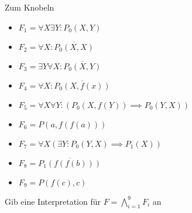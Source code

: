 {\begin{frame}{Zum Knobeln}
	\small
	\begin{block}{}
		\begin{multicols}{2}
			\begin{itemize}
				\item $F_1 = \forall X \exists Y: P_0(X,Y)$
				\item $F_2 = \forall X: \overline{P_0(X,X)}$
				\item $F_3 = \exists Y \forall X: \overline{P_0(X,Y)}$
				\item $F_4 = \forall X: \overline{P_0(X,f(x))}$
				\item {\scriptsize$F_5 = \forall X \forall Y: (P_0(X,f(Y)) \implies P_0(Y,X))$}
				\item $F_6 = P(a, f(f(a)))$
				\item $F_7 = \forall X (\exists Y: P_0(Y,X)\implies P_1(X))$
				\item $F_8 = \overline{P_1(f(f(b)))}$
				\item $F_9 = P(f(c),c)$
			\end{itemize}
		\end{multicols}
		Gib eine Interpretation für $F = \bigwedge_{i=1}^9 F_i$ an
	\end{block}
\end{frame}
}